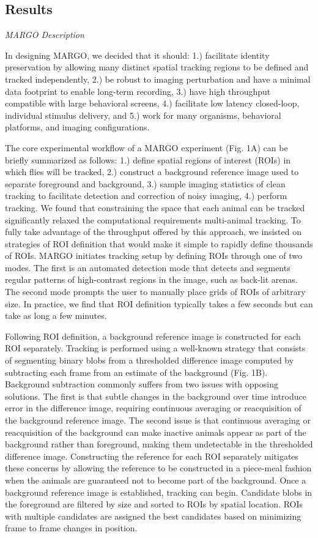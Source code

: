 \documentclass[10pt]{article}
\begin{document}
\begin{multicols}{2}
\section*{Results}

\textit{MARGO Description}

In designing MARGO, we decided that it should: 1.) facilitate identity preservation by allowing many distinct spatial tracking regions to be defined and tracked independently, 2.) be robust to imaging perturbation and have a minimal data footprint to enable long-term recording, 3.) have high throughput compatible with large behavioral screens, 4.) facilitate low latency closed-loop, individual stimulus delivery, and 5.) work for many organisms, behavioral platforms, and imaging configurations.

The core experimental workflow of a MARGO experiment (Fig. 1A) can be briefly summarized as follows: 1.) define spatial regions of interest (ROIs) in which flies will be tracked, 2.) construct a background reference image used to separate foreground and background, 3.) sample imaging statistics of clean tracking to facilitate detection and correction of noisy imaging, 4.) perform tracking.  We found that constraining the space that each animal can be tracked significantly relaxed the computational requirements multi-animal tracking. To fully take advantage of the throughput offered by this approach, we insisted on strategies of ROI definition that would make it simple to rapidly define thousands of ROIs. MARGO initiates tracking setup by defining ROIs through one of two modes. The first is an automated detection mode that detects and segments regular patterns of high-contrast regions in the image, such as back-lit arenas. The second mode prompts the user to manually place grids of ROIs of arbitrary size. In practice, we find that ROI definition typically takes a few seconds but can take as long a few minutes.

Following ROI definition, a background reference image is constructed for each ROI separately. Tracking is performed using a well-known strategy that consists of segmenting binary blobs from a thresholded difference image computed by subtracting each frame from an estimate of the background (Fig. 1B). Background subtraction commonly suffers from two issues with opposing solutions. The first is that subtle changes in the background over time introduce error in the difference image, requiring continuous averaging or reacquisition of the background reference image. The second issue is that continuous averaging or reacquisition of the background can make inactive animals appear as part of the background rather than foreground, making them undetectable in the thresholded difference image. Constructing the reference for each ROI separately mitigates these concerns by allowing the reference to be constructed in a piece-meal fashion when the animals are guaranteed not to become part of the background. Once a background reference image is established, tracking can begin. Candidate blobs in the foreground are filtered by size and sorted to ROIs by spatial location. ROIs with multiple candidates are assigned the best candidates based on minimizing frame to frame changes in position.


\end{multicols}
\end{document}
